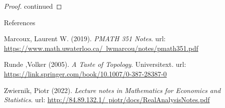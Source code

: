 \documentclass [aspectratio=169, handout]{beamer}
\begin{document}
\begin{frame}

\begin{proof}
continued
\vspace{6cm}
\end{proof}
\end{frame}



\begin{frame}{References}

Marcoux, Laurent W. (2019). \textit{PMATH 351 Notes}. url: \href{https://www.math.uwaterloo.ca/~lwmarcou/notes/pmath351.pdf}{https://www.math.uwaterloo.ca/~lwmarcou/notes/pmath351.pdf}

\vspace{1em}


Runde ,Volker (2005). \textit{A Taste of Topology}. Universitext.  url:  \href{https://link.springer.com/book/10.1007/0-387-28387-0}{https://link.springer.com/book/10.1007/0-387-28387-0} 

\vspace{1em}

Zwiernik, Piotr (2022). \textit{Lecture notes in Mathematics for Economics and Statistics}. url: \href{http://84.89.132.1/~piotr/docs/RealAnalysisNotes.pdf}{http://84.89.132.1/~piotr/docs/RealAnalysisNotes.pdf} \\




\end{frame}
\end{document}
